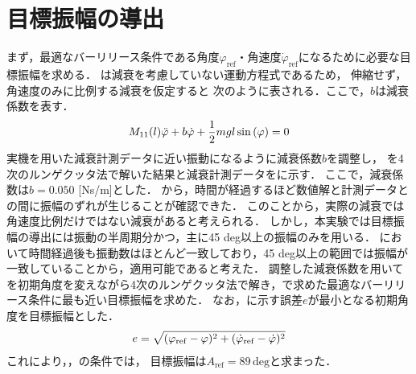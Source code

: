        \section{目標振幅の導出}
          
          まず，最適なバーリリース条件である角度$\varphi_{\mathrm{ref}}$・角速度$\dot{\varphi}_{\mathrm{ref}}$になるために必要な目標振幅を求める．
          は減衰を考慮していない運動方程式であるため，
          伸縮せず，角速度のみに比例する減衰を仮定すると
          次のように表される．ここで，$b$は減衰係数を表す．
          \begin{eqnarray}
            \equlabel{dampingEquation}
            M_{11}(l)\ddot{\varphi}+b\dot{\varphi}+\frac{1}{2}mgl\sin{(\varphi)}=0          
            \end{eqnarray}
          実機を用いた減衰計測データに近い振動になるように減衰係数$b$を調整し，
          を4次のルンゲクッタ法で解いた結果と減衰計測データをに示す．
          ここで，減衰係数は$b=0.050$ [Ns/m]とした．
          から，時間が経過するほど数値解と計測データとの間に振幅のずれが生じることが確認できた．
          このことから，実際の減衰では角速度比例だけではない減衰があると考えられる．
          しかし，本実験では目標振幅の導出には振動の半周期分かつ，主に45 deg以上の振幅のみを用いる．
          において時間経過後も振動数はほとんど一致しており，45 deg以上の範囲では振幅が一致していることから，適用可能であると考えた．
          調整した減衰係数を用いてを初期角度を変えながら4次のルンゲクッタ法で解き，で求めた最適なバーリリース条件に最も近い目標振幅を求めた．
          なお，に示す誤差$e$が最小となる初期角度を目標振幅とした．
          \begin{eqnarray}
            \equlabel{error}
            e=\sqrt{(\varphi_{\mathrm{ref}}-\varphi)^2+(\dot{\varphi}_{\mathrm{ref}}-\dot{\varphi})^2}
            \end{eqnarray}
          これにより，，の条件では，
          目標振幅は$A_{\mathrm{ref}}=89\,\mathrm{deg}$と求まった．

